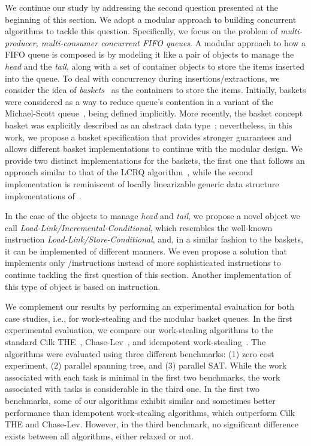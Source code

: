 We continue our study by addressing the second question presented at the beginning of this section. We adopt a modular approach to building concurrent algorithms to tackle this question. Specifically, we focus on the problem of \textit{multi-producer, multi-consumer concurrent FIFO queues}. A modular approach to how a FIFO queue is composed is by modeling it like a pair of objects to manage the \textit{head} and the \textit{tail}, along with a set of container objects to store the items inserted into the queue. To deal with concurrency during insertions/extractions, we consider the idea of \textit{baskets}~\cite{basketqueue2007} as the containers to store the items. Initially, baskets were considered as a way to reduce queue's \CAS contention in a variant of the Michael-Scott queue~\cite{DBLP_conf_podc_MichaelS96}, being defined implicitly. More recently, the basket concept basket was explicitly described as an abstract data type~\cite{scalingconcurrent2020}; nevertheless, in this work, we propose a basket specification that provides stronger guarantees and allows different basket implementations to continue with the modular design. We provide two distinct implementations for the baskets, the first one that follows an approach similar to that of the LCRQ algorithm~\cite{ppopp2013x86queues}, while the second implementation is reminiscent of locally linearizable generic data structure implementations of~\cite{DBLP_conf_concur_HaasHHKLPSSV16}.

 In the case of the objects to manage \textit{head} and \textit{tail}, we propose a novel object we call \textit{Load-Link/Incremental-Conditional}, which resembles the well-known instruction \textit{Load-Link/Store-Conditional}, and, in a similar fashion to the baskets, it can be implemented of different manners. We even propose a solution that implements only \R/\W instructions instead of more sophisticated \RMW instructions to continue tackling the first question of this section. Another implementation of this type of object is based on \CAS instruction.

 We complement our results by performing an experimental evaluation for both case studies, i.e., for work-stealing and the modular basket queues. In the first experimental evaluation, we compare our work-stealing algorithms to the standard Cilk THE~\cite{DBLP_conf_pldi_FrigoLR98}, Chase-Lev~\cite{circular.work.stealing}, and idempotent work-stealing~\cite{maged.vechev.2009}. The algorithms were evaluated using three different benchmarks: (1) zero cost experiment, (2) parallel spanning tree, and (3) parallel SAT. While the work associated with each task is minimal in the first two benchmarks, the work associated with tasks is considerable in the third one. In the first two benchmarks, some of our algorithms exhibit similar and sometimes better performance than idempotent work-stealing algorithms, which outperform Cilk THE and Chase-Lev. However, in the third benchmark, no significant difference exists between all algorithms, either relaxed or not.

